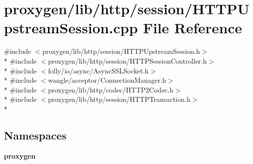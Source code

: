 \section{proxygen/lib/http/session/\+H\+T\+T\+P\+Upstream\+Session.cpp File Reference}
\label{HTTPUpstreamSession_8cpp}
{\ttfamily \#include $<$proxygen/lib/http/session/\+H\+T\+T\+P\+Upstream\+Session.\+h$>$}\\*
{\ttfamily \#include $<$proxygen/lib/http/session/\+H\+T\+T\+P\+Session\+Controller.\+h$>$}\\*
{\ttfamily \#include $<$folly/io/async/\+Async\+S\+S\+L\+Socket.\+h$>$}\\*
{\ttfamily \#include $<$wangle/acceptor/\+Connection\+Manager.\+h$>$}\\*
{\ttfamily \#include $<$proxygen/lib/http/codec/\+H\+T\+T\+P2\+Codec.\+h$>$}\\*
{\ttfamily \#include $<$proxygen/lib/http/session/\+H\+T\+T\+P\+Transaction.\+h$>$}\\*
\subsection*{Namespaces}
\begin{DoxyCompactItemize}
\item 
 {\bf proxygen}
\end{DoxyCompactItemize}
